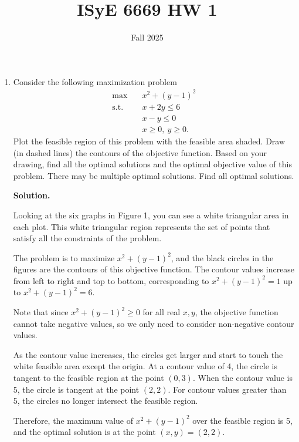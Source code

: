 \documentclass{article}
\title{ISyE 6669 HW 1}
\date{Fall 2025}
\begin{document}
\maketitle


\begin{enumerate}
\item Consider the following maximization problem
\begin{align*}
    \max\quad & x^2 + (y-1)^2 \\
\text{s.t.}\quad & x + 2y \le 6 \\
& x - y \le 0 \\
& x \ge 0,\ y \ge 0.
\end{align*}
Plot the feasible region of this problem with the feasible area shaded. Draw (in dashed lines) the contours of the objective function. Based on your 
drawing, find all the optimal solutions and the optimal objective value of this problem. There may be multiple optimal solutions. Find all optimal solutions.

\hrulefill

\textbf{Solution.}


Looking at the six graphs in Figure 1, you can see a white triangular area in each plot. This white triangular region represents the set of points that satisfy all the constraints of the problem.

The problem is to maximize $x^2 + (y-1)^2$, and the black circles in the figures are the contours of this objective function. The contour values increase from left to right and top to bottom, corresponding to $x^2 + (y-1)^2 = 1$ up to $x^2 + (y-1)^2 = 6$.

Note that since $x^2 + (y-1)^2 \geq 0$ for all real $x, y$, the objective function cannot take negative values, so we only need to consider non-negative contour values.

As the contour value increases, the circles get larger and start to touch the white feasible area except the origin. At a contour value of 4, the circle is tangent to the feasible region at the point $(0, 3)$. When the contour value is 5, the circle is tangent at the point $(2, 2)$. For contour values greater than 5, the circles no longer intersect the feasible region.

Therefore, the maximum value of $x^2 + (y-1)^2$ over the feasible region is 5, and the optimal solution is at the point $(x, y) = (2, 2)$.








\end{enumerate}
\end{document}
